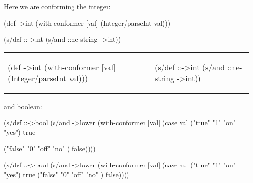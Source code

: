 \noindent

Here we are conforming the integer:

\ifx\DEVICETYPE\MOBILE

\begin{english}
  \begin{clojure}
(def ->int
  (with-conformer [val]
    (Integer/parseInt val)))
  \end{clojure}

\splitter

  \begin{clojure}
(s/def ::->int
  (s/and ::ne-string
         ->int))
  \end{clojure}
\end{english}

\else

\begin{english}

\noindent
\begin{tabular}{ @{}p{5cm} @{}p{5cm} }

  \begin{clojure}
(def ->int
  (with-conformer [val]
    (Integer/parseInt val)))
  \end{clojure}

&

  \begin{clojure}
(s/def ::->int
  (s/and ::ne-string
         ->int))
  \end{clojure}

\end{tabular}

\end{english}

\fi

\noindent
and boolean:

\ifx\DEVICETYPE\MOBILE

\begin{english}
  \begin{clojure}
(s/def ::->bool
  (s/and
   ->lower
   (with-conformer [val]
     (case val
       ("true"  "1" "on"  "yes")
       true

       ("false" "0" "off" "no" )
       false))))
  \end{clojure}
\end{english}

\else

\begin{english}
  \begin{clojure}
(s/def ::->bool
  (s/and
   ->lower
   (with-conformer [val]
     (case val
       ("true"  "1" "on"  "yes") true
       ("false" "0" "off" "no" ) false))))
  \end{clojure}
\end{english}

